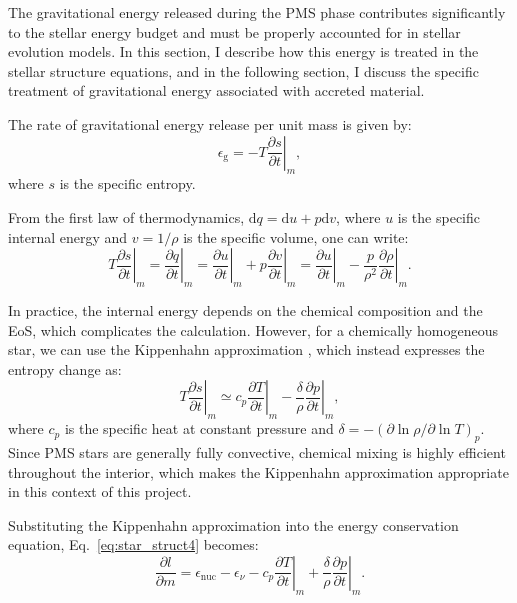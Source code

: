 \documentclass[12pt,a4paper]{article}
\newcommand{\mr}{\mathrm}
\newcommand{\pfird}[2][]{\frac{\partial#1}{\partial#2}}
\newcommand{\dd}[1]{\mathrm{d}#1}
\begin{document}
The gravitational energy released during the PMS phase contributes significantly to the stellar energy budget and must be properly accounted for in stellar evolution models. In this section, I describe how this energy is treated in the stellar structure equations, and in the following section, I discuss the specific treatment of gravitational energy associated with accreted material.

The rate of gravitational energy release per unit mass is given by:
\begin{equation}
  \epsilon_\mr{g} = -T\left.\pfird[s]{t}\right|_m, \label{eq:grav_energy}
\end{equation}
where $s$ is the specific entropy.

From the first law of thermodynamics, $\dd{q} = \dd{u} + p\dd{v}$, where $u$ is the specific internal energy and $v = 1/\rho$ is the specific volume, one can write:
\begin{equation}
  T\left.\pfird[s]{t}\right|_m = \left.\pfird[q]{t}\right|_m = \left.\pfird[u]{t}\right|_m + p\left.\pfird[v]{t}\right|_m = \left.\pfird[u]{t}\right|_m - \frac{p}{\rho^2}\left.\pfird[\rho]{t}\right|_m.
\end{equation}

In practice, the internal energy depends on the chemical composition and the EoS, which complicates the calculation. However, for a chemically homogeneous star, we can use the Kippenhahn approximation \parencite{KippenhahnEtAl2013}, which instead expresses the entropy change as:
\begin{equation}
  T\left.\pfird[s]{t}\right|_m \simeq c_p\left.\pfird[T]{t}\right|_m - \frac{\delta}{\rho}\left.\pfird[p]{t}\right|_m, \label{eq:grav_energy_kipp}
\end{equation}
where $c_p$ is the specific heat at constant pressure and $\delta = -\left(\partial \ln \rho / \partial \ln T\right)_p$. Since PMS stars are generally fully convective, chemical mixing is highly efficient throughout the interior, which makes the Kippenhahn approximation appropriate in this context of this project.

Substituting the Kippenhahn approximation into the energy conservation equation, Eq.~\eqref{eq:star_struct4} becomes:
\begin{equation}
  \pfird[l]{m} = \epsilon_\mr{nuc} - \epsilon_\nu - \left.c_p\pfird[T]{t}\right|_m + \frac{\delta}{\rho}\left.\pfird[p]{t}\right|_m. \label{eq:star_struct4_kipp}
\end{equation}
\end{document}
